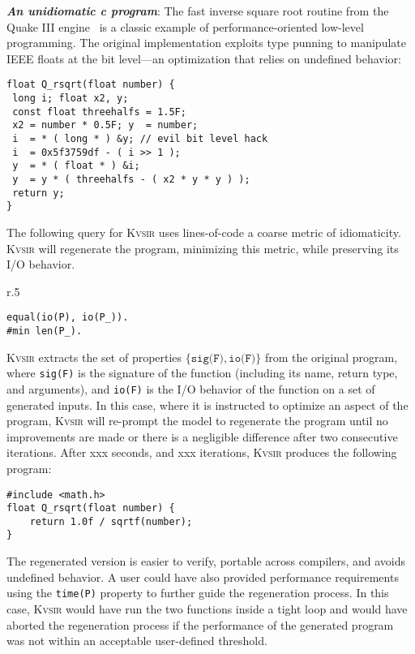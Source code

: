 \documentclass[sigplan]{acmart}
\newcommand{\sys}{{\scshape Kv{\textalpha}sir}\xspace}
\newcommand{\heading}[1]{\vspace{2pt}\noindent\textbf{\emph{#1}}:\enspace}
\newcommand{\ttt}[1]{\texttt{#1}}
\newcommand{\xxx}{\colorbox{red!30}{xxx}\xspace}
\begin{document}
\heading{An unidiomatic c program}
The fast inverse square root routine from the Quake III
engine~\cite{fast_inv_sqrt}
is a classic example of performance-oriented low-level programming.
The original implementation exploits type punning to manipulate IEEE
floats at the bit level---an optimization that relies on undefined behavior:

\begin{verbatim}
float Q_rsqrt(float number) {
 long i; float x2, y;
 const float threehalfs = 1.5F;
 x2 = number * 0.5F; y  = number;
 i  = * ( long * ) &y; // evil bit level hack
 i  = 0x5f3759df - ( i >> 1 );
 y  = * ( float * ) &i;
 y  = y * ( threehalfs - ( x2 * y * y ) );
 return y;
}
\end{verbatim}

The following query for \sys uses lines-of-code a coarse metric of
idiomaticity. \sys will regenerate the program, minimizing this metric, while
preserving its I/O behavior.
\begin{wrapfigure}[3]{r}{.5\columnwidth}
  \vspace{-5pt}
  \begin{verbatim}
equal(io(P), io(P_)).
#min len(P_).
  \end{verbatim}
\end{wrapfigure}
\sys extracts the set of properties $\{\texttt{sig(F)}, \texttt{io(F)}\}$ from the original program, where \texttt{sig(F)} is the
signature of the function (including its name, return type, and arguments), and \texttt{io(F)} is the I/O behavior of the function
on a set of generated inputs.
In this case, where it is instructed to optimize an aspect of the program, \sys will re-prompt
the model to regenerate the program until no improvements are made or there is a negligible difference after two consecutive iterations.
After \xxx seconds, and \xxx iterations, \sys produces the following program:
\begin{verbatim}
#include <math.h>
float Q_rsqrt(float number) {
    return 1.0f / sqrtf(number);
}
\end{verbatim}
The regenerated version is easier to verify, portable across compilers, and
avoids undefined behavior.
A user could have also provided performance requirements using 
the \ttt{time(P)} property to further guide the regeneration process.
In this case, \sys would have run the two functions inside a tight loop and 
would have aborted the regeneration process if the performance of the generated
program was not within an acceptable user-defined threshold.
\end{document}
